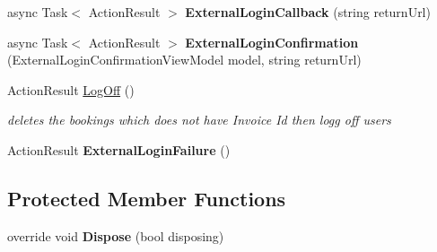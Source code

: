 \begin{DoxyCompactItemize}
async Task$<$ Action\+Result $>$ {\bfseries External\+Login\+Callback} (string return\+Url)
\item 
\mbox{\label{class_alfa_accounting_1_1_controllers_1_1_account_controller_a4af08224d55461ea02f9539439d1fbb7}} 
async Task$<$ Action\+Result $>$ {\bfseries External\+Login\+Confirmation} (External\+Login\+Confirmation\+View\+Model model, string return\+Url)
\item 
Action\+Result \hyperlink{class_alfa_accounting_1_1_controllers_1_1_account_controller_a528cb9ea0f972171ecad9424be46bcc1}{Log\+Off} ()
\begin{DoxyCompactList}\small\item\em deletes the bookings which does not have Invoice Id then logg off users \end{DoxyCompactList}\item 
\mbox{\label{class_alfa_accounting_1_1_controllers_1_1_account_controller_ad9dbad59719b81c4b28f33669993ade2}} 
Action\+Result {\bfseries External\+Login\+Failure} ()
\end{DoxyCompactItemize}
\subsection*{Protected Member Functions}
\begin{DoxyCompactItemize}
\item 
\mbox{\label{class_alfa_accounting_1_1_controllers_1_1_account_controller_a286d0b6e745a7a03d42b5b3a78822e6c}} 
override void {\bfseries Dispose} (bool disposing)
\end{DoxyCompactItemize}
